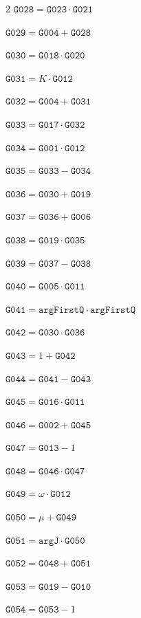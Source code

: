 \documentclass[10pt]{article}
\begin{document}
\begin{multicols}{2}
\noindent $\mathtt{G028}=\mathtt{G023}\cdot \mathtt{G021}$\par
\noindent $\mathtt{G029}=\mathtt{G004}+\mathtt{G028}$\par
\noindent $\mathtt{G030}=\mathtt{G018}\cdot \mathtt{G020}$\par
\noindent $\mathtt{G031}=K\cdot \mathtt{G012}$\par
\noindent $\mathtt{G032}=\mathtt{G004}+\mathtt{G031}$\par
\noindent $\mathtt{G033}=\mathtt{G017}\cdot \mathtt{G032}$\par
\noindent $\mathtt{G034}=\mathtt{G001}\cdot \mathtt{G012}$\par
\noindent $\mathtt{G035}=\mathtt{G033}-\mathtt{G034}$\par
\noindent $\mathtt{G036}=\mathtt{G030}+\mathtt{G019}$\par
\noindent $\mathtt{G037}=\mathtt{G036}+\mathtt{G006}$\par
\noindent $\mathtt{G038}=\mathtt{G019}\cdot \mathtt{G035}$\par
\noindent $\mathtt{G039}=\mathtt{G037}-\mathtt{G038}$\par
\noindent $\mathtt{G040}=\mathtt{G005}\cdot \mathtt{G011}$\par
\noindent $\mathtt{G041}=\mathtt{argFirstQ}\cdot \mathtt{argFirstQ}$\par
\noindent $\mathtt{G042}=\mathtt{G030}\cdot \mathtt{G036}$\par
\noindent $\mathtt{G043}=1+\mathtt{G042}$\par
\noindent $\mathtt{G044}=\mathtt{G041}-\mathtt{G043}$\par
\noindent $\mathtt{G045}=\mathtt{G016}\cdot \mathtt{G011}$\par
\noindent $\mathtt{G046}=\mathtt{G002}+\mathtt{G045}$\par
\noindent $\mathtt{G047}=\mathtt{G013}-1$\par
\noindent $\mathtt{G048}=\mathtt{G046}\cdot \mathtt{G047}$\par
\noindent $\mathtt{G049}=\omega\cdot \mathtt{G012}$\par
\noindent $\mathtt{G050}=\mu+\mathtt{G049}$\par
\noindent $\mathtt{G051}=\mathtt{argJ}\cdot \mathtt{G050}$\par
\noindent $\mathtt{G052}=\mathtt{G048}+\mathtt{G051}$\par
\noindent $\mathtt{G053}=\mathtt{G019}-\mathtt{G010}$\par
\noindent $\mathtt{G054}=\mathtt{G053}-1$\par

\end{multicols}
\end{document}
